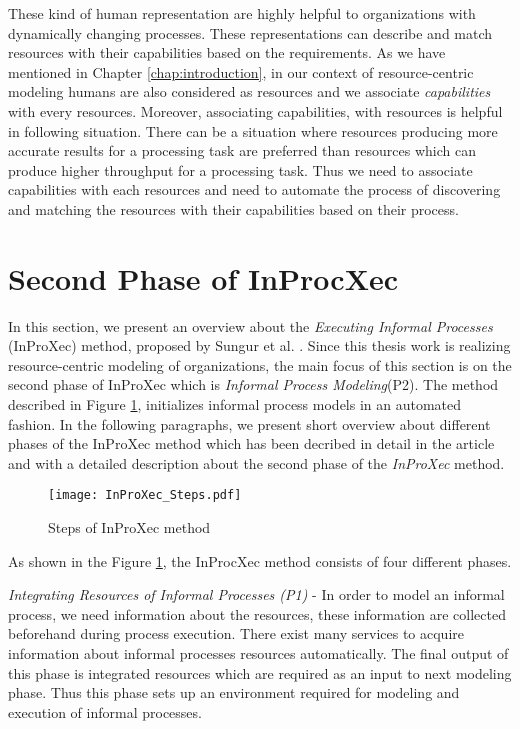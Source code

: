 These kind of human representation are highly helpful to organizations with dynamically changing processes. These representations can describe and match resources with their capabilities based on the requirements. As we have mentioned in Chapter \ref{chap:introduction}, in our context of resource-centric modeling humans are also considered as resources and we associate \textit{capabilities} with every resources. Moreover, associating capabilities, with resources is helpful in following situation. There can be a situation where resources producing more accurate results for a processing task are preferred than resources which can produce higher throughput for a processing task. Thus we need to associate capabilities with each resources and need to automate the process of discovering and matching the resources with their capabilities based on their process. 

\section{Second Phase of InProcXec}
\label{sec:inproxec}
In this section, we present an overview about the \textit{Executing Informal Processes} (InProXec) method, proposed by Sungur et al. \cite{Sungur2015}. Since this thesis work is realizing resource-centric modeling of organizations, the main focus of this section is on the second phase of InProXec which is \textit{Informal Process Modeling}(P2). The method described in Figure \ref{fig:inprocxec_steps}, initializes informal process models in an automated fashion. In the following paragraphs, we present short overview about different phases of the InProXec method which has been decribed in detail in the article \cite{Sungur2015} and with a detailed description about the second phase of the \textit{InProXec} method. 

\begin{figure}
	\centering
	\texttt{[image: InProXec\_Steps.pdf]}
	\caption{Steps of InProXec method \cite{Sungur2015}}
	\label{fig:inprocxec_steps}
\end{figure} 

As shown in the Figure \ref{fig:inprocxec_steps}, the InProcXec method consists of four different phases.

\textit{Integrating Resources of Informal Processes (P1)} - In order to model an informal process, we need information about the resources, these information are collected beforehand during process execution. There exist many services to acquire information about informal processes resources automatically. The final output of this phase is integrated resources which are required as an input to next modeling phase. Thus this phase sets up an environment required for modeling and execution of informal processes.  

